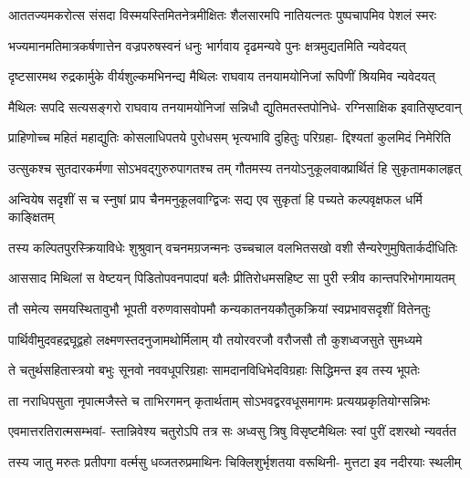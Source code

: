 \fourlineindentedshloka
{आततज्यमकरोत्स संसदा}
{विस्मयस्तिमितनेत्रमीक्षितः}
{शैलसारमपि नातियत्नतः}
{पुष्पचापमिव पेशलं स्मरः} %

\twolineshloka
{भज्यमानमतिमात्रकर्षणात्तेन वज्रपरुषस्वनं धनुः}
{भार्गवाय दृढमन्यवे पुनः क्षत्रमुद्यतमिति न्यवेदयत्} %

\twolineshloka
{दृष्टसारमथ रुद्रकार्मुके वीर्यशुल्कमभिनन्द्य मैथिलः}
{राघवाय तनयामयोनिजां रूपिणीं श्रियमिव न्यवेदयत्} %

\fourlineindentedshloka
{मैथिलः सपदि सत्यसङ्गरो}
{राघवाय तनयामयोनिजां}
{सन्निधौ द्युतिमतस्तपोनिधे-}
{रग्निसाक्षिक इवातिसृष्टवान्} %

\fourlineindentedshloka
{प्राहिणोच्च महितं महाद्युतिः}
{कोसलाधिपतये पुरोधसम्}
{भृत्यभावि दुहितुः परिग्रहा-}
{द्दिश्यतां कुलमिदं निमेरिति} %

\twolineshloka
{उत्सुकश्च सुतदारकर्मणा सोऽभवद्गुरुरुपागतश्च तम्}
{गौतमस्य तनयोऽनुकूलवाक्प्रार्थितं हि सुकृतामकालहृत्} %

\fourlineindentedshloka
{अन्वियेष सदृशीं स च स्नुषां}
{प्राप चैनमनुकूलवाग्द्विजः}
{सद्य एव सुकृतां हि पच्यते}
{कल्पवृक्षफल धर्मि काङ्क्षितम्} %

\twolineshloka
{तस्य कल्पितपुरस्क्रियाविधेः शुश्रुवान् वचनमग्रजन्मनः}
{उच्चचाल वलभितसखो वशी सैन्यरेणुमुषितार्कदीधितिः} %

\fourlineindentedshloka
{आससाद मिथिलां स वेष्टयन्}
{पिडितोपवनपादपां बलैः}
{प्रीतिरोधमसहिष्ट सा पुरी}
{स्त्रीव कान्तपरिभोगमायतम्} %

\fourlineindentedshloka
{तौ समेत्य समयस्थितावुभौ}
{भूपती वरुणवासवोपमौ}
{कन्यकातनयकौतुकक्रियां}
{स्वप्रभावसदृशीं वितेनतुः} %

\fourlineindentedshloka
{पार्थिवीमुदवहद्रघूद्वहो}
{लक्ष्मणस्तदनुजामथोर्मिलाम्}
{यौ तयोरवरजौ वरौजसौ}
{तौ कुशध्वजसुते सुमध्यमे} %

\fourlineindentedshloka
{ते चतुर्थसहितास्त्रयो बभुः}
{सूनवो नववधूपरिग्रहाः}
{सामदानविधिभेदविग्रहाः}
{सिद्धिमन्त इव तस्य भूपतेः} %

\twolineshloka
{ता नराधिपसुता नृपात्मजैस्ते च ताभिरगमन् कृतार्थताम्}
{सोऽभवद्वरवधूसमागमः प्रत्ययप्रकृतियोग्सन्निभः} %

\fourlineindentedshloka
{एवमात्तरतिरात्मसम्भवां-}
{स्तान्निवेश्य चतुरोऽपि तत्र सः}
{अध्वसु त्रिषु विसृष्टमैथिलः}
{स्वां पुरीं दशरथो न्यवर्तत} %

\fourlineindentedshloka
{तस्य जातु मरुतः प्रतीपगा}
{वर्त्मसु धव्जतरुप्रमाथिनः}
{चिक्लिशुर्भृशतया वरूथिनी-}
{मुत्तटा इव नदीरयाः स्थलीम्} %

